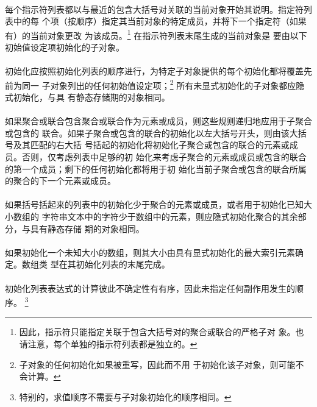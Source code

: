 \paragraph{}
每个指示符列表都以与最近的包含大括号对关联的当前对象开始其说明。指定符列表中的每
个项（按顺序）指定其当前对象的特定成员，并将下一个指定符（如果有）的当前对象更改
为该成员。\footnote{因此，指示符只能指定关联于包含大括号对的聚合或联合的严格子对
象。也请注意，每个单独的指示符列表都是独立的。} 在指示符列表末尾生成的当前对象是
要由以下初始值设定项初始化的子对象。

\paragraph{}
初始化应按照初始化列表的顺序进行，为特定子对象提供的每个初始化都将覆盖先前为同一
子对象列出的任何初始值设定项；\footnote{子对象的任何初始化如果被重写，因此而不用
于初始化该子对象，则可能不会计算。} 所有未显式初始化的子对象都应隐式初始化，与具
有静态存储期的对象相同。

\paragraph{}
如果聚合或联合包含聚合或联合作为元素或成员，则这些规则递归地应用于子聚合或包含的
联合。如果子聚合或包含的联合的初始化以左大括号开头，则由该大括号及其匹配的右大括
号括起的初始化将初始化子聚合或包含的联合的元素或成员。否则，仅考虑列表中足够的初
始化来考虑子聚合的元素或成员或包含的联合的第一个成员；剩下的任何初始化都将用于初
始化当前子聚合或包含的联合所属的聚合的下一个元素或成员。

\paragraph{}
如果括号括起来的列表中的初始化少于聚合的元素或成员，或者用于初始化已知大小数组的
字符串文本中的字符少于数组中的元素，则应隐式初始化聚合的其余部分，与具有静态存储
期的对象相同。

\paragraph{}
如果初始化一个未知大小的数组，则其大小由具有显式初始化的最大索引元素确定。数组类
型在其初始化列表的末尾完成。

\paragraph{}
初始化列表表达式的计算彼此不确定性有有序，因此未指定任何副作用发生的顺序。
\footnote{特别的，求值顺序不需要与子对象初始化的顺序相同。}

